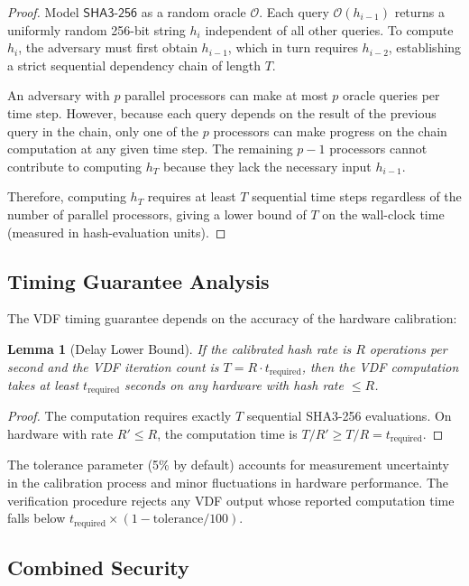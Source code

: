 \documentclass[conference,10pt]{IEEEtran}
\newtheorem{lemma}[theorem]{Lemma}
\newcommand{\SHAthree}{\textsf{SHA3-256}}
\begin{document}
\begin{proof}
Model $\SHAthree{}$ as a random oracle $\mathcal{O}$. Each query $\mathcal{O}(h_{i-1})$ returns a uniformly random 256-bit string $h_i$ independent of all other queries. To compute $h_i$, the adversary must first obtain $h_{i-1}$, which in turn requires $h_{i-2}$, establishing a strict sequential dependency chain of length $T$.

An adversary with $p$ parallel processors can make at most $p$ oracle queries per time step. However, because each query depends on the result of the previous query in the chain, only one of the $p$ processors can make progress on the chain computation at any given time step. The remaining $p-1$ processors cannot contribute to computing $h_T$ because they lack the necessary input $h_{i-1}$.

Therefore, computing $h_T$ requires at least $T$ sequential time steps regardless of the number of parallel processors, giving a lower bound of $T$ on the wall-clock time (measured in hash-evaluation units).
\end{proof}

\subsection{Timing Guarantee Analysis}

The VDF timing guarantee depends on the accuracy of the hardware calibration:

\begin{lemma}[Delay Lower Bound]
\label{lem:delay}
If the calibrated hash rate is $R$ operations per second and the VDF iteration count is $T = R \cdot t_{\text{required}}$, then the VDF computation takes at least $t_{\text{required}}$ seconds on any hardware with hash rate $\leq R$.
\end{lemma}

\begin{proof}
The computation requires exactly $T$ sequential SHA3-256 evaluations. On hardware with rate $R' \leq R$, the computation time is $T/R' \geq T/R = t_{\text{required}}$.
\end{proof}

The tolerance parameter (5\% by default) accounts for measurement uncertainty in the calibration process and minor fluctuations in hardware performance. The verification procedure rejects any VDF output whose reported computation time falls below $t_{\text{required}} \times (1 - \text{tolerance}/100)$.

\subsection{Combined Security}
\end{document}
